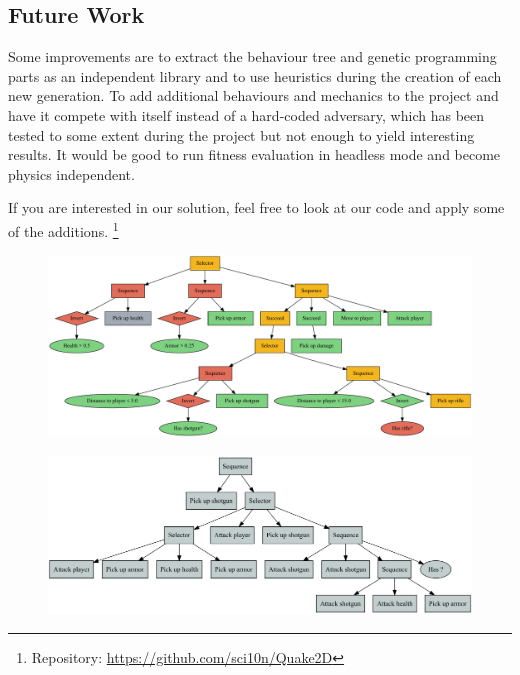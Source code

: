 \documentclass[a4paper, twocolumn]{article}
\begin{document}
    \vspace{-0.5em}

    \subsection*{Future Work}

    Some improvements are to extract the behaviour tree and genetic programming parts as an independent library and to use heuristics during the creation of each new generation. To add additional behaviours and mechanics to the project and have it compete with itself instead of a hard-coded adversary, which has been tested to some extent during the project but not enough to yield interesting results. It would be good to run fitness evaluation in headless mode and become physics independent.

    If you are interested in our solution, feel free to look at our code and apply some of the additions. \footnote{Repository: \url{https://github.com/sci10n/Quake2D}}

    \clearpage

    \nocite{*} %
    
    

    \onecolumn
    \clearpage

    \appendix

    \thispagestyle{empty}

    \begin{figure}[H]
        \centering
        \includegraphics[angle=90,height=0.98\textheight]{share/hand_crafted_behaviour_tree.pdf}
    \end{figure}

    \clearpage

    \thispagestyle{empty}

    \begin{figure}[H]
        \centering
        \includegraphics[angle=90,height=0.98\textheight]{share/tree-fitness-3780.png}
    \end{figure}
\end{document}
